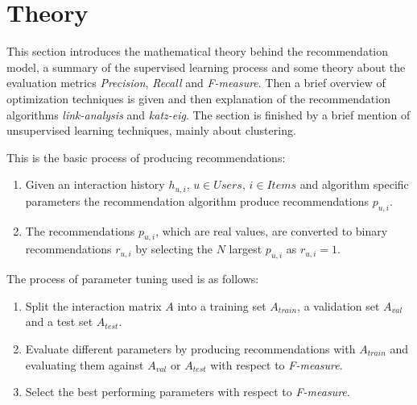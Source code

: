 
\section{Theory}\label{sec:theory}

This section introduces the mathematical theory behind the recommendation model, a summary of the supervised learning process and some theory about the evaluation metrics \textit{Precision}, \textit{Recall} and \textit{F-measure}. Then a brief overview of optimization techniques is given and then explanation of the recommendation algorithms \textit{link-analysis} and \textit{katz-eig}. The section is finished by a brief mention of unsupervised learning techniques, mainly about clustering.

This is the basic process of producing recommendations:

\begin{enumerate}
    \item Given an interaction history $h_{u, i}$, $u \in Users$, $i \in Items$ and algorithm specific parameters the recommendation algorithm produce recommendations $p_{u, i}$.
    \item The recommendations $p_{u, i}$, which are real values, are converted to binary recommendations $r_{u, i}$ by selecting the $N$ largest $p_{u, i}$ as $r_{u, i} = 1$.
\end{enumerate}

The process of parameter tuning used is as follows:

\begin{enumerate}
    \item Split the interaction matrix $A$ into a training set $A_{train}$, a validation set $A_{val}$ and a test set $A_{test}$.
    \item Evaluate different parameters by producing recommendations with $A_{train}$ and evaluating them against $A_{val}$ or $A_{test}$ with respect to \textit{F-measure}.
    \item Select the best performing parameters with respect to \textit{F-measure}.
\end{enumerate}












